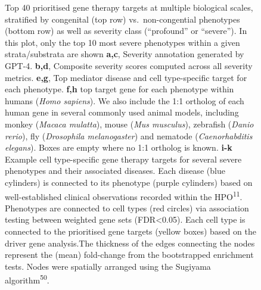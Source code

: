 \documentclass[
]{article}
\begin{document}
\label{cell-fig-therapy-examples}
\begin{figure}[H]


\caption{\label{fig-therapy-examples}Top 40 prioritised gene therapy
targets at multiple biological scales, stratified by congenital (top
row) vs.~non-congential phenotypes (bottom row) as well as severity
class (``profound'' or ``severe''). In this plot, only the top 10 most
severe phenotypes within a given strata/substrata are shown
\textbf{a,c}, Severity annotation generated by GPT-4. \textbf{b,d},
Composite severity scores computed across all severity metrics.
\textbf{e,g}, Top mediator disease and cell type-specific target for
each phenotype. \textbf{f,h} top target gene for each phenotype within
humans (\emph{Homo sapiens}). We also include the 1:1 ortholog of each
human gene in several commonly used animal models, including monkey
(\emph{Macaca mulatta}), mouse (\emph{Mus musculus}), zebrafish
(\emph{Danio rerio}), fly (\emph{Drosophila melanogaster}) and nematode
(\emph{Caenorhabditis elegans}). Boxes are empty where no 1:1 ortholog
is known. \textbf{i-k} Example cell type-specific gene therapy targets
for several severe phenotypes and their associated diseases. Each
disease (blue cylinders) is connected to its phenotype (purple
cylinders) based on well-established clinical observations recorded
within the HPO\textsuperscript{11}. Phenotypes are connected to cell
types (red circles) via association testing between weighted gene sets
(FDR\textless0.05). Each cell type is connected to the prioritised gene
targets (yellow boxes) based on the driver gene analysis.The thickness
of the edges connecting the nodes represent the (mean) fold-change from
the bootstrapped enrichment tests. Nodes were spatially arranged using
the Sugiyama algorithm\textsuperscript{50}.}

\end{figure}%
\end{document}
